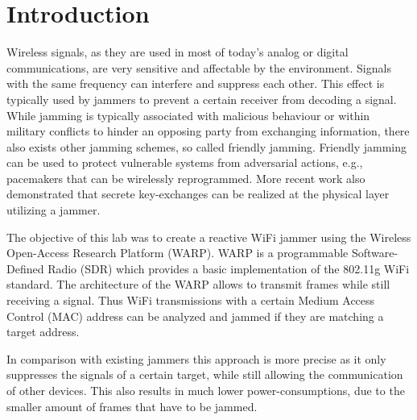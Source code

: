 \documentclass[sigconf]{acmart}
\begin{document}
\maketitle

\section{Introduction}
Wireless signals, as they are used in most of today's analog or digital communications, are very
sensitive and affectable by the environment. Signals with the same frequency can interfere and
suppress each other. This effect is typically used by jammers to prevent a certain receiver from
decoding a signal. While jamming is typically associated with malicious behaviour or within military
conflicts to hinder an opposing party from exchanging information, there also exists other jamming
schemes, so called friendly jamming. Friendly jamming can be used to protect vulnerable systems from
adversarial actions, e.g., pacemakers that can be wirelessly reprogrammed. More recent work also
demonstrated that secrete key-exchanges can be realized at the physical layer utilizing a jammer.

The objective of this lab was to create a reactive WiFi jammer using the Wireless Open-Access
Research Platform (WARP). WARP is a programmable Software-Defined Radio (SDR) which provides a basic
implementation of the 802.11g WiFi standard. The architecture of the WARP allows to transmit frames
while still receiving a signal. Thus WiFi transmissions with a certain Medium Access Control (MAC)
address can be analyzed and jammed if they are matching a target address.

In comparison with existing jammers this approach is more precise as it only suppresses the signals
of a certain target, while still allowing the communication of other devices. This also results in
much lower power-consumptions, due to the smaller amount of frames that have to be jammed.

\end{document}
